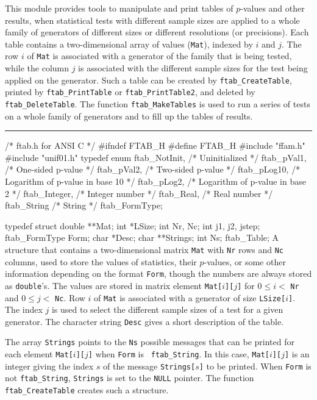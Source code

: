 
This module provides tools to manipulate and print tables of $p$-values
and other results, when statistical tests with different sample sizes are
applied to a whole family of generators of different sizes or different
resolutions (or precisions). Each table contains a two-dimensional array of
values ({\tt Mat}), indexed by $i$ and $j$. The row $i$ of {\tt Mat} is
associated with a generator of the family that is being tested, while the
column $j$ is associated with the different sample sizes for the test
being applied on the generator. Such a table can be created by
{\tt ftab\_CreateTable}, printed by {\tt ftab\_PrintTable} or
{\tt ftab\_PrintTable2}, and deleted by {\tt ftab\_DeleteTable}.
The function {\tt ftab\_MakeTables} is used to run a series of tests on a
whole family of generators and to fill up the tables of results.

\bigskip
\hrule
\code\hide
/* ftab.h for ANSI C */
#ifndef FTAB_H
#define FTAB_H
\endhide
#include "ffam.h"
#include "unif01.h"
\endcode
\code
\hide
typedef enum {
   ftab_NotInit,              /* Uninitialized */
   ftab_pVal1,                /* One-sided p-value */
   ftab_pVal2,                /* Two-sided p-value */
   ftab_pLog10,               /* Logarithm of p-value in base 10 */
   ftab_pLog2,                /* Logarithm of p-value in base 2 */
   ftab_Integer,              /* Integer number */
   ftab_Real,                 /* Real number */
   ftab_String                /* String */
} ftab_FormType;
\endhide

typedef struct {
   double **Mat;
   int *LSize;
   int Nr, Nc;
   int j1, j2, jstep;
   ftab_FormType Form;
   char *Desc;
   char **Strings;
   int Ns;
} ftab_Table;
\endcode
 \tab
  A structure that contains a two-dimensional matrix {\tt Mat} with {\tt Nr}
  rows and {\tt Nc} columns, used to store the values of statistics, their
  $p$-values, or some other information depending on the format {\tt Form},
  though the numbers are always stored as {\tt double}'s.
  The values are stored in matrix element {\tt Mat[$i$][$j$]} for
  $0 \le i <$ {\tt Nr} and $0 \le j <$ {\tt Nc}. Row $i$ of {\tt Mat}
  is associated with a generator of size {\tt LSize[$i$]}. The index $j$ is
  used to select the different sample sizes of a test for a given
  generator. The character string {\tt Desc} gives a short description of
  the table.

  The array {\tt Strings} points to the {\tt Ns} possible messages that can
  be printed for each element {\tt Mat[$i$][$j$]} when {\tt Form} is {\tt
  ftab\_String}. In this case, {\tt Mat[$i$][$j$]} is an integer giving the
  index $s$ of the message {\tt Strings[$s$]} to be printed. When {\tt Form}
  is not {\tt ftab\_String}, {\tt Strings} is set to the {\tt NULL}
  pointer.
  The function {\tt ftab\_CreateTable} creates such a structure.
 \endtab




